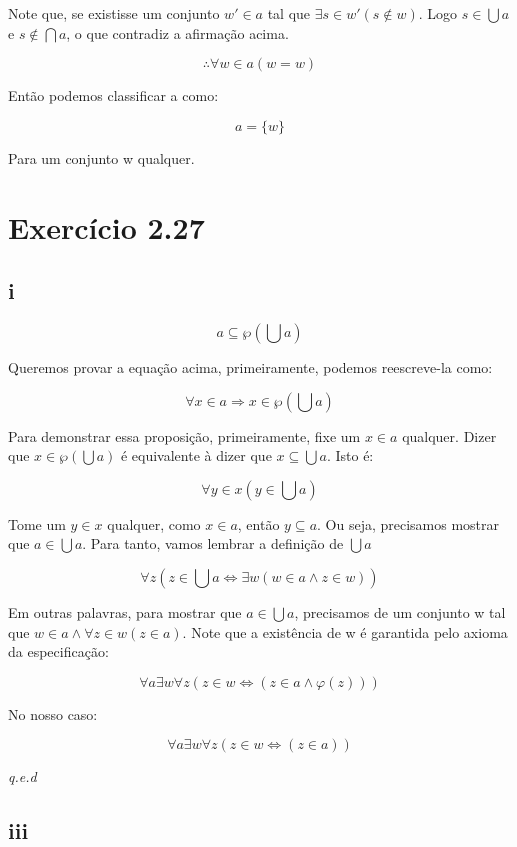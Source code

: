\documentclass[12pt]{extarticle}
\newcommand{\fim}{\begin{flushright}

   \emph{q.e.d}
\end{flushright}}
\begin{document}
Note que, se existisse um conjunto $w' \in a$ tal que $\exists s \in w' (s \notin w)$. Logo $s \in \bigcup a$ e $s \notin \bigcap a$, o que contradiz a afirmação acima.

$$
\therefore \forall w \in a (w = w)
$$

Então podemos classificar a como:

$$a = \{w\}$$

Para um conjunto w qualquer.

\section{Exercício 2.27}

\subsection{i} 

$$
    a \subseteq \wp (\bigcup a)
$$

Queremos provar a equação acima, primeiramente, podemos reescreve-la como:

$$\forall x \in a  \Rightarrow x \in \wp (\bigcup a)$$

Para demonstrar essa proposição, primeiramente, fixe um $x \in a$ qualquer. Dizer que $x \in \wp (\bigcup a)$ é equivalente à dizer que $x \subseteq \bigcup a$. Isto é:

$$\forall y \in x (y \in \bigcup a)$$

Tome um $y \in x$ qualquer, como $x \in a$, então $y \subseteq a$. Ou seja, precisamos mostrar que $a \in \bigcup a$. Para tanto, vamos lembrar a definição de $\bigcup a$

$$\forall z (z \in \bigcup a \Leftrightarrow \exists w (w \in a \land z \in w))$$

Em outras palavras, para mostrar que $a \in \bigcup a$, precisamos de um conjunto w tal que $w \in a \land \forall z \in w (z \in a)$. Note que a existência de w é garantida pelo axioma da especificação: 

$$\forall a \exists w \forall z (z \in w \Leftrightarrow (z \in a \land \varphi(z)))$$

No nosso caso:

$$\forall a \exists w \forall z (z \in w \Leftrightarrow (z \in a))$$

\fim

\subsection{iii}
\end{document}
